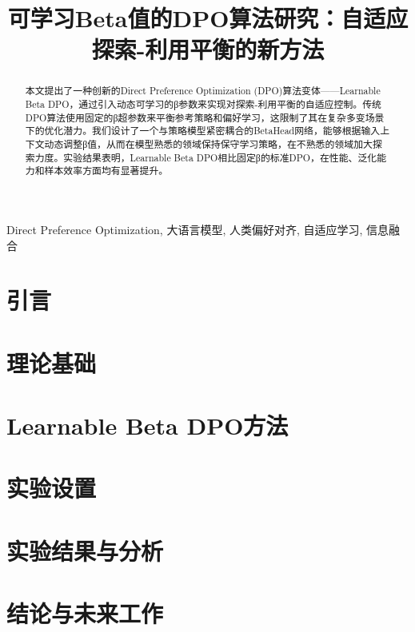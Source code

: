\documentclass[conference]{IEEEtran}
\begin{document}
\title{可学习Beta值的DPO算法研究：自适应探索-利用平衡的新方法}

\author{
}

\maketitle

\begin{abstract}
本文提出了一种创新的Direct Preference Optimization (DPO)算法变体——Learnable Beta DPO，通过引入动态可学习的β参数来实现对探索-利用平衡的自适应控制。传统DPO算法使用固定的β超参数来平衡参考策略和偏好学习，这限制了其在复杂多变场景下的优化潜力。我们设计了一个与策略模型紧密耦合的BetaHead网络，能够根据输入上下文动态调整β值，从而在模型熟悉的领域保持保守学习策略，在不熟悉的领域加大探索力度。实验结果表明，Learnable Beta DPO相比固定β的标准DPO，在性能、泛化能力和样本效率方面均有显著提升。
\end{abstract}

\begin{IEEEkeywords}
Direct Preference Optimization, 大语言模型, 人类偏好对齐, 自适应学习, 信息融合
\end{IEEEkeywords}

\section{引言}


\section{理论基础}


\section{Learnable Beta DPO方法}


\section{实验设置}


\section{实验结果与分析}


\section{结论与未来工作}




\end{document}
